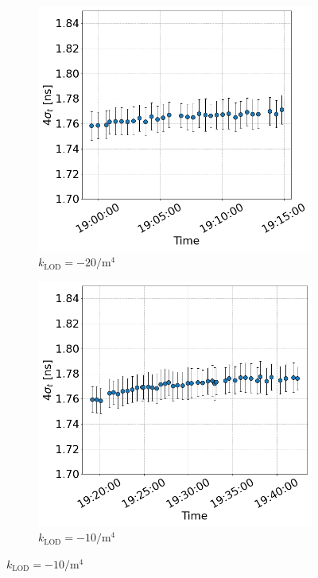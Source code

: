 \begin{figure}[htp]
\begin{subfigure}{.45\textwidth}
        \includegraphics[width=.95\linewidth]{images/app_c/bunch_length_cc_md_sep_coast7.png}  
        \caption{$k_\mathrm{LOD}=-20 \mathrm{/m^{4}}$}
    \end{subfigure}
    \begin{subfigure}{.45\textwidth}
        \centering
        \includegraphics[width=.95\linewidth]{images/app_c/bunch_length_cc_md_sep_coast8.png}  
        \caption{$k_\mathrm{LOD}=-10 \mathrm{/m^{4}}$}

\end{subfigure}
\end{figure}
